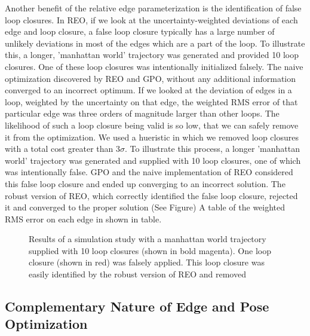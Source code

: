 Another benefit of the relative edge parameterization is the identification of false loop closures.  In REO, if we look at the uncertainty-weighted deviations of each edge and loop closure, a false loop closure typically has a large number of unlikely deviations in most of the edges which are a part of the loop.  To illustrate this, a longer, 'manhattan world' trajectory was generated and provided 10 loop closures.  One of these loop closures was intentionally initialized falsely.  The naive optimization discovered by REO and GPO, without any additional information converged to an incorrect optimum.  If we looked at the deviation of edges in a loop, weighted by the uncertainty on that edge, the weighted RMS error of that particular edge was three orders of magnitude larger than other loops.  The likelihood of such a loop closure being valid is so low, that we can safely remove it from the optimization.  We used a hueristic in which we removed loop closures with a total cost greater than $3\sigma$.  To illustrate this process, a longer 'manhattan world' trajectory was generated and supplied with 10 loop closures, one of which was intentionally false.  GPO and the naive implementation of REO considered this false loop closure and ended up converging to an incorrect solution.  The robust version of REO, which correctly identified the false loop closure, rejected it and converged to the proper solution (See Figure)  A table of the weighted RMS error on each edge in shown in table.


\begin{figure}
  \caption{Results of a simulation study with a manhattan world trajectory supplied with 10 loop closures (shown in bold magenta).  One loop closure (shown in red) was falsely applied.  This loop closure was easily identified by the robust version of REO and removed}
  \label{fig:false_loop_closure}
\end{figure}

\subsection{Complementary Nature of Edge and Pose Optimization}

